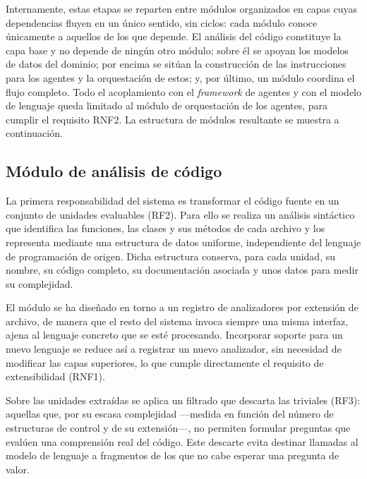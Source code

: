 Internamente, estas etapas se reparten entre módulos organizados en capas
cuyas dependencias fluyen en un único sentido, sin ciclos: cada módulo
conoce únicamente a aquellos de los que depende. El análisis del código
constituye la capa base y no depende de ningún otro módulo; sobre él se
apoyan los modelos de datos del dominio; por encima se sitúan la
construcción de las instrucciones para los agentes y la orquestación de
estos; y, por último, un módulo coordina el flujo completo. Todo el
acoplamiento con el \emph{framework} de agentes y con el modelo de
lenguaje queda limitado al módulo de orquestación de los agentes, para
cumplir el requisito RNF2. La estructura de módulos resultante se
muestra a continuación.

\begin{dirtreebox}
\end{dirtreebox}

\subsection{Módulo de análisis de código}
\label{sec:diseno-parser}

La primera responsabilidad del sistema es transformar el código fuente en
un conjunto de unidades evaluables (RF2). Para ello se realiza un análisis
sintáctico que identifica las funciones, las clases y sus métodos
de cada archivo y los representa mediante una estructura de datos
uniforme, independiente del lenguaje de programación de origen. Dicha
estructura conserva, para cada unidad, su nombre, su código completo, su
documentación asociada y unos datos para medir su complejidad.

El módulo se ha diseñado en torno a un registro de analizadores por
extensión de archivo, de manera que el resto del sistema invoca siempre
una misma interfaz, ajena al lenguaje concreto que se esté procesando.
Incorporar soporte para un nuevo lenguaje se reduce así a registrar un
nuevo analizador, sin necesidad de modificar las capas superiores, lo que
cumple directamente el requisito de extensibilidad (RNF1).

Sobre las unidades extraídas se aplica un filtrado que descarta las
triviales (RF3): aquellas que, por su escasa complejidad ---medida en
función del número de estructuras de control y de su extensión---, no
permiten formular preguntas que evalúen una comprensión real del código.
Este descarte evita destinar llamadas al modelo de lenguaje a fragmentos
de los que no cabe esperar una pregunta de valor.

